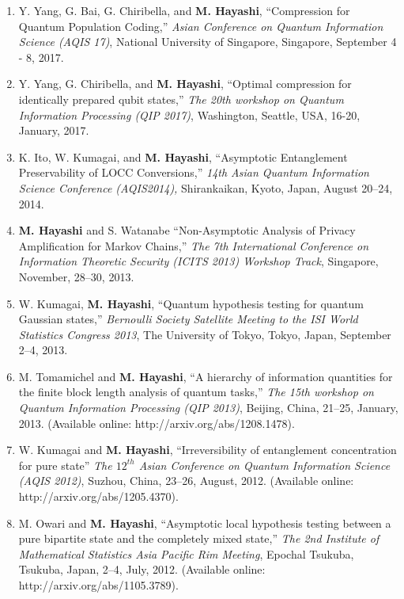 \documentclass[a4paper,12pt,oneside]{article}
\begin{document}
\begin{enumerate}
\item 
Y. Yang, G. Bai, G. Chiribella, and \textbf{M. Hayashi}, ``Compression for Quantum Population Coding,'' 
{\em Asian Conference on Quantum Information Science (AQIS 17)}, 
National University of Singapore, Singapore, September 4 - 8, 2017.

\item 
Y. Yang, G. Chiribella, and \textbf{M. Hayashi}, ``Optimal compression for identically prepared qubit states,'' 
{\em The 20th workshop on Quantum Information Processing (QIP 2017)}, 
Washington, Seattle, USA, 16-20, January, 2017.

\item 
K. Ito, W. Kumagai, and \textbf{M. Hayashi}, 
``Asymptotic Entanglement Preservability of LOCC Conversions,'' 
{\em 14th Asian Quantum Information Science Conference (AQIS2014),} Shirankaikan, Kyoto, Japan, August 20--24, 2014.

\item 
\textbf{M. Hayashi} and S. Watanabe
``Non-Asymptotic Analysis of Privacy Amplification for Markov Chains,''
{\em The 7th International Conference on Information Theoretic Security (ICITS 2013) Workshop Track},
Singapore, November, 28--30, 2013.

\item
W. Kumagai, \textbf{M. Hayashi}, 
``Quantum hypothesis testing for quantum Gaussian states,'' 
{\em Bernoulli Society Satellite Meeting to the ISI World Statistics Congress 2013}, 
The University of Tokyo, Tokyo, Japan,
September 2--4, 2013.

\item 
M. Tomamichel and \textbf{M. Hayashi}, ``A hierarchy of information quantities for the finite block length analysis of quantum tasks,''
{\em The 15th workshop on Quantum Information Processing (QIP 2013)}, Beijing, China, 21--25, January, 2013.
(Available online: http://arxiv.org/abs/1208.1478).

\item 
W. Kumagai and \textbf{M. Hayashi}, ``Irreversibility of entanglement concentration for pure state''
{\em The $12^{th}$ Asian Conference on Quantum Information Science (AQIS 2012)},
Suzhou, China, 23--26, August, 2012.
(Available online: http://arxiv.org/abs/1205.4370).

\item 
M. Owari and \textbf{M. Hayashi}, 
``Asymptotic local hypothesis testing between a pure bipartite state and the completely mixed state,''
{\em The 2nd Institute of Mathematical Statistics Asia Pacific Rim Meeting}, 
Epochal Tsukuba, Tsukuba, Japan, 2--4, July, 2012.
(Available online: http://arxiv.org/abs/1105.3789).


\end{enumerate}
\end{document}
